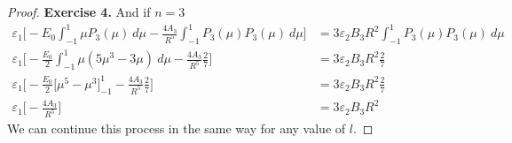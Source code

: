 \documentclass[11pt]{article}
\theoremstyle{definition}
\begin{document}
\begin{proof}{\textbf{Exercise 4.}}
And if $n = 3$
\begin{align*}
    \varepsilon_1\bigg[
    -E_0\int_{-1}^1 \mu P_3(\mu)~d\mu
    - \frac{4A_3}{R^{5}} \int_{-1}^1P_3(\mu)P_3(\mu)~d\mu
    \bigg]
    &= 3\varepsilon_2 B_3 R^2\int_{-1}^1 P_3(\mu)P_3(\mu)~d\mu\\
    \varepsilon_1\bigg[
    -\frac{E_0}{2}\int_{-1}^1 \mu(5\mu^3 - 3\mu)~d\mu
    - \frac{4A_3}{R^{5}}\frac{2}{7}
    \bigg]
    &= 3\varepsilon_2 B_3 R^2\frac{2}{7}\\
    \varepsilon_1\bigg[
    -\frac{E_0}{2}\bigg[\mu^5 - \mu^3\bigg]_{-1}^1
    - \frac{4A_3}{R^{5}}\frac{2}{7}\bigg]
    &= 3\varepsilon_2 B_3 R^2\frac{2}{7}\\
    \varepsilon_1\bigg[-\frac{4A_3}{R^{5}}\bigg]
    &= 3\varepsilon_2 B_3 R^2
\end{align*}
We can continue this process in the same way for any value of $l$.
\end{proof}
\end{document}
